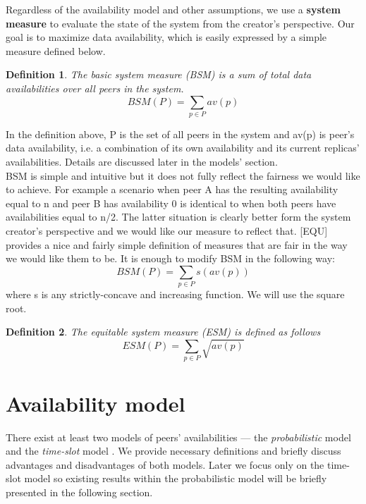 \documentclass{pracamgren}
\newcounter{collective_ctr} \numberwithin{collective_ctr}{section}
\newtheorem{definition}{Definition}[collective_ctr]
\begin{document}
Regardless of the availability model and other assumptions, we use a {\bf system measure} to evaluate the state of the system from the creator's perspective. Our goal is to maximize data availability, which is easily expressed by a simple measure defined below.

\begin{definition}
The {\it basic system measure (BSM)} is a sum of total data availabilities over all peers in the system.
$$BSM(P) = \sum_{p\in P} av(p)$$
\end{definition}


In the definition above, P is the set of all peers in the system and av(p) is peer's data availability, i.e. a combination of its own availability and its current replicas' availabilities. Details are discussed later in the models' section.\\

BSM is simple and intuitive but it does not fully reflect the fairness we would like to achieve. For example a scenario when peer A has the resulting availability equal to n and peer B has availability 0 is identical to when both peers have availabilities equal to n/2. The latter situation is clearly better form the system creator's perspective and we would like our measure to reflect that. [EQU] provides a nice and fairly simple definition of measures that are fair in the way we would like them to be. It is enough to modify BSM in the following way:\\
$$BSM(P) = \sum_{p\in P} s(av(p))$$
where s is any strictly-concave and increasing function. We will use the square root.\\

\begin{definition}
The {\it equitable system measure (ESM)} is defined as follows
$$ESM(P) = \sum_{p\in P} \sqrt{av(p)}$$
\end{definition}

\section{Availability model}

There exist at least two models of peers' availabilities --- the {\it probabilistic} model and the {\it time-slot} model \cite{krz}. We provide necessary definitions and briefly discuss advantages and disadvantages of both models. Later we focus only on the time-slot model so existing results within the probabilistic model will be briefly presented in the following section.
\end{document}
